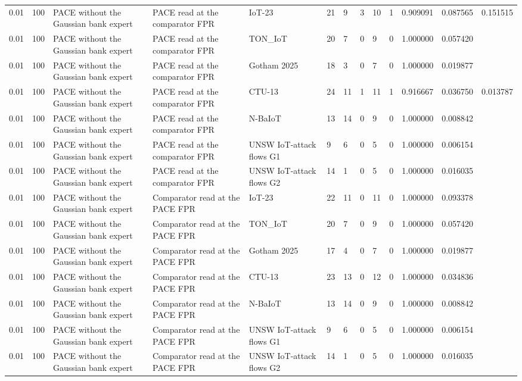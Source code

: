 \begin{tabular}{lllllllllllll}
0.01 & 100 & PACE without the Gaussian bank expert & PACE read at the comparator FPR & IoT-23 & 21 & 9 & 3 & 10 & 1 & 0.909091 & 0.087565 & 0.151515 \\
0.01 & 100 & PACE without the Gaussian bank expert & PACE read at the comparator FPR & TON\_IoT & 20 & 7 & 0 & 9 & 0 & 1.000000 & 0.057420 &  \\
0.01 & 100 & PACE without the Gaussian bank expert & PACE read at the comparator FPR & Gotham 2025 & 18 & 3 & 0 & 7 & 0 & 1.000000 & 0.019877 &  \\
0.01 & 100 & PACE without the Gaussian bank expert & PACE read at the comparator FPR & CTU-13 & 24 & 11 & 1 & 11 & 1 & 0.916667 & 0.036750 & 0.013787 \\
0.01 & 100 & PACE without the Gaussian bank expert & PACE read at the comparator FPR & N-BaIoT & 13 & 14 & 0 & 9 & 0 & 1.000000 & 0.008842 &  \\
0.01 & 100 & PACE without the Gaussian bank expert & PACE read at the comparator FPR & UNSW IoT-attack flows G1 & 9 & 6 & 0 & 5 & 0 & 1.000000 & 0.006154 &  \\
0.01 & 100 & PACE without the Gaussian bank expert & PACE read at the comparator FPR & UNSW IoT-attack flows G2 & 14 & 1 & 0 & 5 & 0 & 1.000000 & 0.016035 &  \\
0.01 & 100 & PACE without the Gaussian bank expert & Comparator read at the PACE FPR & IoT-23 & 22 & 11 & 0 & 11 & 0 & 1.000000 & 0.093378 &  \\
0.01 & 100 & PACE without the Gaussian bank expert & Comparator read at the PACE FPR & TON\_IoT & 20 & 7 & 0 & 9 & 0 & 1.000000 & 0.057420 &  \\
0.01 & 100 & PACE without the Gaussian bank expert & Comparator read at the PACE FPR & Gotham 2025 & 17 & 4 & 0 & 7 & 0 & 1.000000 & 0.019877 &  \\
0.01 & 100 & PACE without the Gaussian bank expert & Comparator read at the PACE FPR & CTU-13 & 23 & 13 & 0 & 12 & 0 & 1.000000 & 0.034836 &  \\
0.01 & 100 & PACE without the Gaussian bank expert & Comparator read at the PACE FPR & N-BaIoT & 13 & 14 & 0 & 9 & 0 & 1.000000 & 0.008842 &  \\
0.01 & 100 & PACE without the Gaussian bank expert & Comparator read at the PACE FPR & UNSW IoT-attack flows G1 & 9 & 6 & 0 & 5 & 0 & 1.000000 & 0.006154 &  \\
0.01 & 100 & PACE without the Gaussian bank expert & Comparator read at the PACE FPR & UNSW IoT-attack flows G2 & 14 & 1 & 0 & 5 & 0 & 1.000000 & 0.016035 &  \\

\end{tabular}
